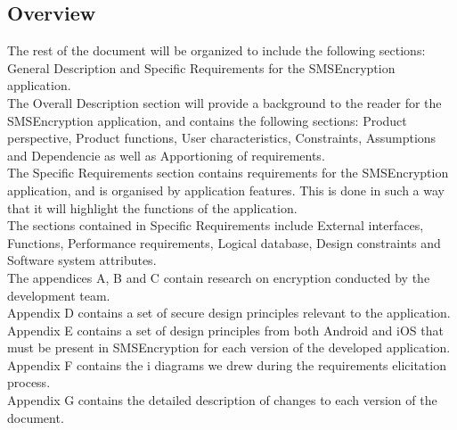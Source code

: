 \subsection{Overview}
The rest of the document will be organized to include the following sections: General Description and Specific Requirements for the SMSEncryption application.
\vspace{10pt}\\
The Overall Description section will provide a background to the reader for the SMSEncryption application, and contains the following sections: Product perspective, Product functions, User characteristics, Constraints,  Assumptions and Dependencie as well as Apportioning of requirements.
\vspace{10pt}\\
The Specific Requirements section contains requirements for the SMSEncryption application, and is organised by application features. This is done in such a way that it will highlight the functions of the application. 
\vspace{10pt}\\
The sections contained in Specific Requirements include External interfaces, Functions, Performance requirements, Logical database, Design constraints and Software system attributes.
\vspace{10pt}\\
The appendices A, B and C contain research on encryption conducted by the development team.
\vspace{10pt}\\
Appendix D contains a set of secure design principles relevant to the application.
\vspace{10pt}\\
Appendix E contains a set of design principles from both Android and iOS that must be present in SMSEncryption for each version of the developed application.
\vspace{10pt}\\
Appendix F contains the i\text{*} diagrams we drew during the requirements elicitation process.
\vspace{10pt}\\
Appendix G contains the detailed description of changes to each version of the document.